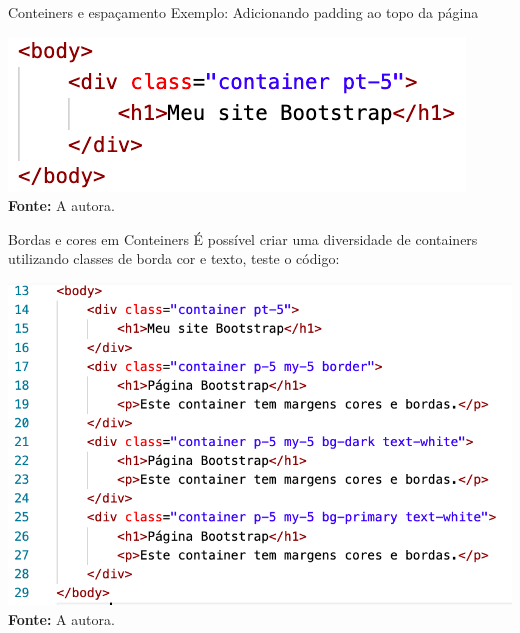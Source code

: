 \documentclass{beamer}
\begin{document}
\begin{frame}{Conteiners e espaçamento}
Exemplo: Adicionando padding ao topo da página\\
\begin{center}
       \includegraphics[height=0.37\paperheight]{fig/aula6/aula6_3.png} \\
       \tiny{\textbf{Fonte: } A autora.}
      \end{center}
\end{frame}
\begin{frame}{Bordas e cores em Conteiners}
É possível criar uma diversidade de containers utilizando classes de borda cor e texto, teste o código:\\
\begin{center}
       \includegraphics[height=0.4\paperheight]{fig/aula6/aula6_4.png} \\
       \tiny{\textbf{Fonte: } A autora.}
      \end{center}
\end{frame}
\end{document}
